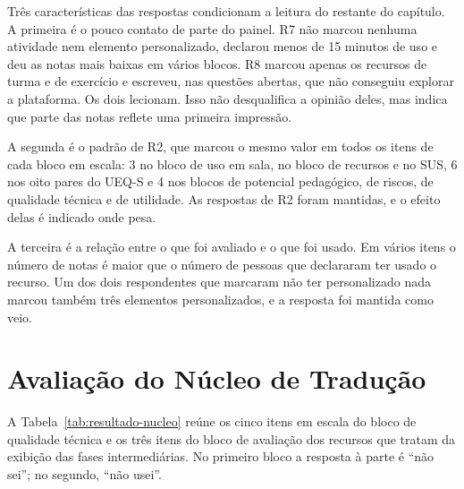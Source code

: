 Três características das respostas condicionam a leitura do restante do capítulo. A primeira é o pouco contato de parte do painel. R7 não marcou nenhuma atividade nem elemento personalizado, declarou menos de 15 minutos de uso e deu as notas mais baixas em vários blocos. R8 marcou apenas os recursos de turma e de exercício e escreveu, nas questões abertas, que não conseguiu explorar a plataforma. Os dois lecionam. Isso não desqualifica a opinião deles, mas indica que parte das notas reflete uma primeira impressão.

A segunda é o padrão de R2, que marcou o mesmo valor em todos os itens de cada bloco em escala: 3 no bloco de uso em sala, no bloco de recursos e no SUS, 6 nos oito pares do UEQ-S e 4 nos blocos de potencial pedagógico, de riscos, de qualidade técnica e de utilidade. As respostas de R2 foram mantidas, e o efeito delas é indicado onde pesa.

A terceira é a relação entre o que foi avaliado e o que foi usado. Em vários itens o número de notas é maior que o número de pessoas que declararam ter usado o recurso. Um dos dois respondentes que marcaram não ter personalizado nada marcou também três elementos personalizados, e a resposta foi mantida como veio.

\section{Avaliação do Núcleo de Tradução}
\label{sec:resultado-nucleo}

A Tabela~\ref{tab:resultado-nucleo} reúne os cinco itens em escala do bloco de qualidade técnica e os três itens do bloco de avaliação dos recursos que tratam da exibição das fases intermediárias. No primeiro bloco a resposta à parte é ``não sei''; no segundo, ``não usei''.

